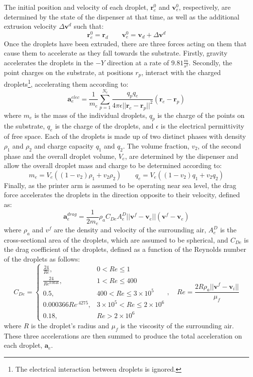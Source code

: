 \documentclass[a4paper,12pt]{report}
\begin{document}
The initial position and velocity of each droplet, $\bm{r}_e^0$ and $\bm{v}_e^0$, respectively, are determined by the state of the dispenser at that time, as well as the additional extrusion velocity $\Delta \bm{v}^d$ such that:
$$ \bm{r}_e^0 = \bm{r}_d \qquad \bm{v}_e^0 = \bm{v}_d + \Delta \bm{v}^d  $$
Once the droplets have been extruded, there are three forces acting on them that cause them to accelerate as they fall towards the substrate. Firstly, gravity accelerates the droplets in the $-Y$ direction at a rate of $9.81\frac{m}{s^2}$. Secondly, the point charges on the substrate, at positions $r_p$, interact with the charged droplets\footnote{The electrical interaction between droplets is ignored.}, accelerating them according to:
$$ \bm{a}_e^{elec} = \frac{1}{m_e}\sum_{p=1}^{N_c} \frac{q_pq_e}{4\pi\epsilon||\bm{r}_e-\bm{r}_p||^2}(\bm{r}_e - \bm{r}_p) $$
where $m_e$ is the mass of the individual droplets, $q_p$ is the charge of the points on the substrate, $q_e$ is the charge of the droplets, and $\epsilon$ is the electrical permittivity of free space. Each of the droplets is made up of two distinct phases with density $\rho_1$ and $\rho_2$ and charge capacity $q_1$ and $q_2$. The volume fraction, $v_2$, of the second phase and the overall droplet volume, $V_e$, are determined by the dispenser and allow the overall droplet mass and charge to be determined according to:
$$ m_e = V_e((1-v_2)\rho_1 + v_2\rho_2) \qquad q_e = V_e((1-v_2)q_1 + v_2q_2) $$
Finally, as the printer arm is assumed to be operating near sea level, the drag force accelerates the droplets in the direction opposite to their velocity, defined as:
$$ \bm{a}_e^{drag} = \frac{1}{2m_e}\rho_aC_{De}A_e^D||\bm{v}^f - \bm{v}_e||(\bm{v}^f - \bm{v}_e)$$
where $\rho_a$ and $v^f$ are the density and velocity of the surrounding air, $A_e^D$ is the cross-sectional area of the droplets, which are assumed to be spherical, and $C_{De}$ is the drag coefficient of the droplets, defined as a function of the Reynolds number of the droplets as follows:
$$C_{De}=
\begin{cases}
\frac{24}{Re}, & 0 < Re \leq 1 \\
\frac{24}{Re^{0.0646}}, & 1 < Re \leq 400 \\
0.5, & 400 < Re \leq 3\times10^5 \\ 
0.000366Re^{.4275}, & 3\times10^5 < Re \leq 2 \times 10^6 \\
0.18, & Re > 2 \times 10^6
\end{cases}
, \quad Re = \frac{2R\rho_a||\bm{v}^f - \bm{v}_i||}{\mu_f}
$$
where $R$ is the droplet's radius and $\mu_f$ is the viscosity of the surrounding air.
These three accelerations are then summed to produce the total acceleration on each droplet, $\bm{a}_e$.
\end{document}
